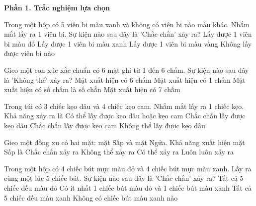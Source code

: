 \textbf{Phần 1. Trắc nghiệm lựa chọn}

\begin{ex} %
Trong một hộp có 5 viên bi màu xanh và không có viên bi nào màu khác. Nhắm mắt lấy ra 1 viên bi. Sự kiện nào sau đây là 'Chắc chắn' xảy ra?
\choice
{Lấy được 1 viên bi màu đỏ}
{\True Lấy được 1 viên bi màu xanh}
{Lấy được 1 viên bi màu vàng}
{Không lấy được viên bi nào}
\end{ex}

\begin{ex} %
Gieo một con xúc xắc chuẩn có 6 mặt ghi từ 1 đến 6 chấm. Sự kiện nào sau đây là 'Không thể' xảy ra?
\choice
{Mặt xuất hiện có 6 chấm}
{Mặt xuất hiện có 1 chấm}
{Mặt xuất hiện có số chấm là số chẵn}
{\True Mặt xuất hiện có 7 chấm}
\end{ex}

\begin{ex} %
Trong túi có 3 chiếc kẹo dâu và 4 chiếc kẹo cam. Nhắm mắt lấy ra 1 chiếc kẹo. Khả năng xảy ra là
\choice
{\True Có thể lấy được kẹo dâu hoặc kẹo cam}
{Chắc chắn lấy được kẹo dâu}
{Chắc chắn lấy được kẹo cam}
{Không thể lấy được kẹo dâu}
\end{ex}

\begin{ex} %
Gieo một đồng xu có hai mặt: mặt Sấp và mặt Ngửa. Khả năng xuất hiện mặt Sấp là
\choice
{Chắc chắn xảy ra}
{Không thể xảy ra}
{\True Có thể xảy ra}
{Luôn luôn xảy ra}
\end{ex}

\begin{ex} %
Trong một hộp có 4 chiếc bút mực màu đỏ và 4 chiếc bút mực màu xanh. Lấy ra cùng một lúc 5 chiếc bút. Sự kiện nào sau đây là 'Chắc chắn' xảy ra?
\choice
{Tất cả 5 chiếc đều màu đỏ}
{\True Có ít nhất 1 chiếc bút màu đỏ và 1 chiếc bút màu xanh}
{Tất cả 5 chiếc đều màu xanh}
{Không có chiếc bút màu xanh nào}
\end{ex}


